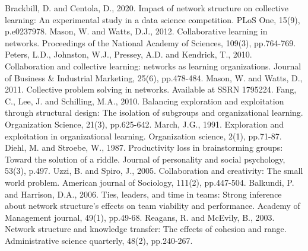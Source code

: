 \documentclass[conference]{IEEEtran}
\begin{document}
\begin{thebibliography}{00}
 Brackbill, D. and Centola, D., 2020. Impact of network structure on collective learning: An experimental study in a data science competition. PLoS One, 15(9), p.e0237978.
 Mason, W. and Watts, D.J., 2012. Collaborative learning in networks. Proceedings of the National Academy of Sciences, 109(3), pp.764-769.
 Peters, L.D., Johnston, W.J., Pressey, A.D. and Kendrick, T., 2010. Collaboration and collective learning: networks as learning organizations. Journal of Business \& Industrial Marketing, 25(6), pp.478-484.
 Mason, W. and Watts, D., 2011. Collective problem solving in networks. Available at SSRN 1795224.
 Fang, C., Lee, J. and Schilling, M.A., 2010. Balancing exploration and exploitation through structural design: The isolation of subgroups and organizational learning. Organization Science, 21(3), pp.625-642.
 March, J.G., 1991. Exploration and exploitation in organizational learning. Organization science, 2(1), pp.71-87.
 Diehl, M. and Stroebe, W., 1987. Productivity loss in brainstorming groups: Toward the solution of a riddle. Journal of personality and social psychology, 53(3), p.497.
 Uzzi, B. and Spiro, J., 2005. Collaboration and creativity: The small world problem. American journal of Sociology, 111(2), pp.447-504.
 Balkundi, P. and Harrison, D.A., 2006. Ties, leaders, and time in teams: Strong inference about network structure’s effects on team viability and performance. Academy of Management journal, 49(1), pp.49-68.
 Reagans, R. and McEvily, B., 2003. Network structure and knowledge transfer: The effects of cohesion and range. Administrative science quarterly, 48(2), pp.240-267.
\end{thebibliography}
\end{document}
